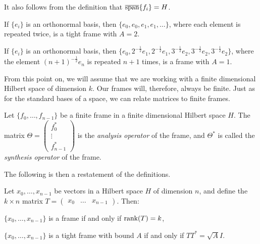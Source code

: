 \documentclass[../../../main]{subfiles}
\begin{document}
It also follows from the definition that $\overline{\text{span}}\{f_i\}=H$.

\begin{ex}
 If $\{e_i\}$ is an orthonormal basis, then $\{e_0,e_0,e_1,e_1,\dots\}$, where each element is repeated twice, is a tight frame with $A=2$.
\end{ex}

\begin{ex}
 If $\{e_i\}$ is an orthonormal basis, then $\{e_0,2^{-\frac{1}{2}}e_1,2^{-\frac{1}{2}}e_1,3^{-\frac{1}{2}}e_2,3^{-\frac{1}{2}}e_2,3^{-\frac{1}{2}}e_2\}$, where the element $(n+1)^{-\frac{1}{2}}e_n$ is repeated $n+1$ times, is a frame with $A=1$.
\end{ex}

From this point on, we will assume that we are working with a finite dimensional
Hilbert space of dimension $k$. Our frames will, therefore, always be finite.
Just as for the standard bases of a space, we can relate 
matrices to finite frames. 

\begin{defin}
 Let $\{f_0, \dots,f_{n-1}\}$ be a finite frame in a finite dimensional Hilbert space $H$. The matrix $\Theta=\left(\begin{smallmatrix} f_0^* \\ \vdots \\ f_{n-1}^* \end{smallmatrix}\right)$ is the {\it analysis operator} of the frame, and $\Theta^*$ is called the {\it synthesis operator} of the frame.
\end{defin}

The following is then a restatement of the definitions.

\begin{prop}
 Let $x_0,\dots,x_{n-1}$ be vectors in a Hilbert space $H$ of dimension $n$, and define the $k \times n$ matrix $T=\left(\begin{smallmatrix} x_0 & \dots & x_{n-1} \end{smallmatrix}\right)$. Then:
 \begin{defenum}
  \item $\{x_0,\dots,x_{n-1}\}$ is a frame if and only if $\text{rank}(T)=k$,
  \item $\{x_0,\dots,x_{n-1}\}$ is a tight frame with bound $A$ if and only if $TT^*=\sqrt{A}I$.
 \end{defenum}
\end{prop}
\end{document}
